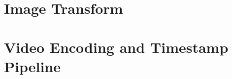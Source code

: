 \documentclass{erauthesis}
\begin{document}


% 

% 

% 




% 


\backmatter


\chapter{Image Transform} \label{img_tform}


\chapter{Video Encoding and Timestamp Pipeline} \label{append_video_pipeline}
\end{document}
